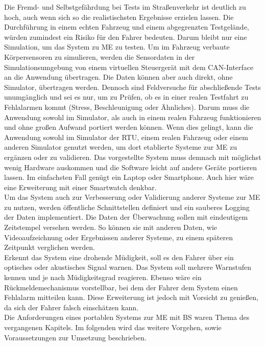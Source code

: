 {Die Fremd- und Selbstgefährdung bei Tests im Straßenverkehr ist deutlich zu hoch, auch wenn sich so die realistischsten Ergebnisse erzielen lassen. Die Durchführung in einem echten Fahrzeug und einem abgegrenzten Testgelände, würden zumindest ein Risiko für den Fahrer bedeuten. Darum bleibt nur eine Simulation, um das System zu \acl{ME} zu testen. Um im Fahrzeug verbaute Körpersensoren zu simulieren, werden die Sensordaten in der Simulationsumgebung von einem virtuellen Steuergerät mit dem CAN-Interface an die Anwendung übertragen. Die Daten können aber auch direkt, ohne Simulator, übertragen werden. 
Dennoch sind Feldversuche für abschließende Tests unumgänglich und sei es nur, um zu Prüfen, ob es in einer realen Testfahrt zu Fehlalarmen kommt (Stress, Beschleunigung oder Ähnliches). Darum muss die Anwendung sowohl im Simulator, als auch in einem realen Fahrzeug funktionieren und ohne großen Aufwand portiert werden können. Wenn dies gelingt, kann die Anwendung sowohl im Simulator der \acl{RTU}, einem realen Fahrzeug oder einem anderen Simulator genutzt werden, um dort etablierte Systeme zur \acl{ME} zu ergänzen oder zu validieren.
Das vorgestellte System muss demnach mit möglichst wenig Hardware auskommen und die Software leicht auf andere Geräte portieren lassen. Im einfachsten Fall genügt ein Laptop oder Smartphone. Auch hier wäre eine Erweiterung mit  einer Smartwatch denkbar.\\

Um das System auch zur Verbesserung oder Validierung anderer Systeme zur \acl{ME} zu nutzen, werden öffentliche Schnittstellen definiert und ein sauberes Logging der Daten implementiert. Die Daten der Überwachung sollen mit eindeutigem Zeitstempel versehen werden. So können sie mit anderen Daten, wie Videoaufzeichnung oder Ergebnissen anderer Systeme, zu einem späteren Zeitpunkt verglichen werden. \\

Erkennt das System eine drohende Müdigkeit, soll es den Fahrer über ein optisches oder akustisches Signal warnen. Das System soll mehrere Warnstufen kennen und je nach Müdigkeitsgrad reagieren. Ebenso wäre ein Rückmeldemechanismus vorstellbar, bei dem der Fahrer dem System einen Fehlalarm mitteilen kann. Diese Erweiterung ist jedoch mit Vorsicht zu genießen, da sich der Fahrer falsch einschätzen kann. \\

Die Anforderungen eines portablen Systems zur \acl{ME} mit \acl{BS} waren Thema des vergangenen Kapitels. Im folgenden wird das weitere Vorgehen, sowie Voraussetzungen zur Umsetzung beschrieben.

}
